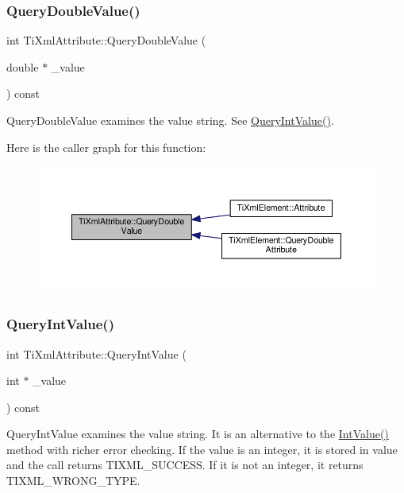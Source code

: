 \subsubsection{\texorpdfstring{Query\+Double\+Value()}{QueryDoubleValue()}}
{\footnotesize\ttfamily int Ti\+Xml\+Attribute\+::\+Query\+Double\+Value (\begin{DoxyParamCaption}\item[{double $\ast$}]{\+\_\+value }\end{DoxyParamCaption}) const}



Query\+Double\+Value examines the value string. See \hyperlink{class_ti_xml_attribute_a6caa8090d2fbb7966700a16e45ed33de}{Query\+Int\+Value()}. 

Here is the caller graph for this function\+:
\nopagebreak
\begin{figure}[H]
\begin{center}
\leavevmode
\includegraphics[width=350pt]{class_ti_xml_attribute_a6fa41b710c1b79de37a97004aa600c06_icgraph}
\end{center}
\end{figure}
\mbox{\label{class_ti_xml_attribute_a6caa8090d2fbb7966700a16e45ed33de}} 
\subsubsection{\texorpdfstring{Query\+Int\+Value()}{QueryIntValue()}}
{\footnotesize\ttfamily int Ti\+Xml\+Attribute\+::\+Query\+Int\+Value (\begin{DoxyParamCaption}\item[{int $\ast$}]{\+\_\+value }\end{DoxyParamCaption}) const}

Query\+Int\+Value examines the value string. It is an alternative to the \hyperlink{class_ti_xml_attribute_ac8501370b065df31a35003c81d87cef2}{Int\+Value()} method with richer error checking. If the value is an integer, it is stored in \textquotesingle{}value\textquotesingle{} and the call returns T\+I\+X\+M\+L\+\_\+\+S\+U\+C\+C\+E\+SS. If it is not an integer, it returns T\+I\+X\+M\+L\+\_\+\+W\+R\+O\+N\+G\+\_\+\+T\+Y\+PE.

